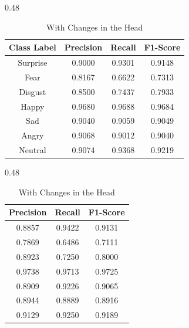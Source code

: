\begin{table}[H]
\centering
\caption{Comparison of Large Model Classification Results}
\label{tab:class_large_model_comparison}

\begin{subtable}{0.48\textwidth}
\centering
\small %
\caption{Without Changes in the Head}
\begin{tabular}{cccc}
\hline
\textbf{Class Label} & \textbf{Precision} & \textbf{Recall} & \textbf{F1-Score} \\ \hline
Surprise  & 0.9000 & 0.9301 & 0.9148 \\
Fear      & 0.8167 & 0.6622 & 0.7313 \\
Disgust & 0.8500 & 0.7437 & 0.7933 \\
Happy     & 0.9680 & 0.9688 & 0.9684 \\
Sad       & 0.9040 & 0.9059 & 0.9049 \\
Angry     & 0.9068 & 0.9012 & 0.9040 \\
Neutral   & 0.9074 & 0.9368 & 0.9219 \\
\hline
\end{tabular}
\end{subtable}
\hfill
\begin{subtable}{0.48\textwidth}
\centering
\small
\caption{With Changes in the Head}
\begin{tabular}{ccc}
\hline
\textbf{Precision} & \textbf{Recall} & \textbf{F1-Score} \\ \hline
0.8857 & 0.9422 & 0.9131 \\
0.7869 & 0.6486 & 0.7111 \\
0.8923 & 0.7250 & 0.8000 \\
0.9738 & 0.9713 & 0.9725 \\
0.8909 & 0.9226 & 0.9065 \\
0.8944 & 0.8889 & 0.8916 \\
0.9129 & 0.9250 & 0.9189 \\
\hline
\end{tabular}
\end{subtable}

\end{table}

%
%
%


\newpage
